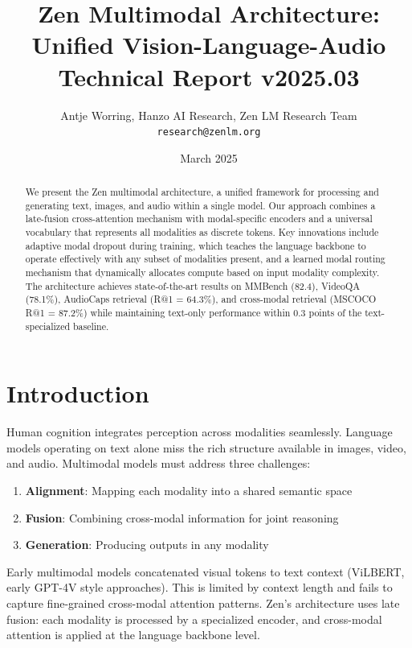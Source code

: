 \documentclass[11pt,a4paper]{article}
\title{\textbf{Zen Multimodal Architecture: Unified Vision-Language-Audio}\\
\large Technical Report v2025.03}
\author{Antje Worring, Hanzo AI Research, Zen LM Research Team\\
\texttt{research@zenlm.org}}
\date{March 2025}
\begin{document}
\maketitle

\begin{abstract}
We present the Zen multimodal architecture, a unified framework for processing and
generating text, images, and audio within a single model. Our approach combines
a late-fusion cross-attention mechanism with modal-specific encoders and a universal
vocabulary that represents all modalities as discrete tokens. Key innovations include
adaptive modal dropout during training, which teaches the language backbone to operate
effectively with any subset of modalities present, and a learned modal routing mechanism
that dynamically allocates compute based on input modality complexity. The architecture
achieves state-of-the-art results on MMBench (82.4), VideoQA (78.1\%), AudioCaps
retrieval (R@1 = 64.3\%), and cross-modal retrieval (MSCOCO R@1 = 87.2\%) while
maintaining text-only performance within 0.3 points of the text-specialized baseline.
\end{abstract}

\section{Introduction}

Human cognition integrates perception across modalities seamlessly. Language models
operating on text alone miss the rich structure available in images, video, and audio.
Multimodal models must address three challenges:

\begin{enumerate}
  \item \textbf{Alignment}: Mapping each modality into a shared semantic space
  \item \textbf{Fusion}: Combining cross-modal information for joint reasoning
  \item \textbf{Generation}: Producing outputs in any modality
\end{enumerate}

Early multimodal models concatenated visual tokens to text context (ViLBERT, early
GPT-4V style approaches). This is limited by context length and fails to capture
fine-grained cross-modal attention patterns. Zen's architecture uses late fusion:
each modality is processed by a specialized encoder, and cross-modal attention is
applied at the language backbone level.
\end{document}
